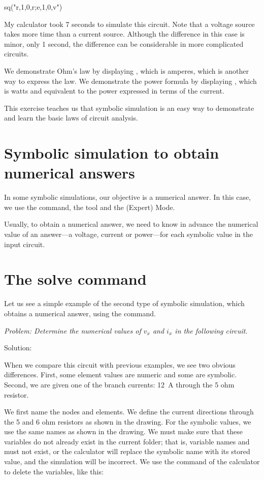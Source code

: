 \begin{entry}
sq\dc("r,1,0,r;e,1,0,v")
\end{entry}

My calculator took 7 seconds to simulate this circuit. Note that a
voltage source takes more time than a current source. Although the
difference in this case is minor, only 1 second, the difference can
be considerable in more complicated circuits.

We demonstrate Ohm's law by displaying , which is
 amperes, which is another way to express the law. We
demonstrate the power formula by displaying , which is
 watts and equivalent to the power expressed in terms
of the current.

This exercise teaches us that symbolic simulation is an easy way to
demonstrate and learn the basic laws of circuit analysis.

\section{Symbolic simulation to obtain numerical answers}

In some symbolic simulations, our objective is a numerical answer.
In this case, we use the  command, the 
tool and the (Expert) Mode.

Usually, to obtain a numerical answer, we need to know in advance
the numerical value of an answer---a voltage, current or power---for
each symbolic value in the input circuit.

\section{The solve command}

Let us see a simple example of the second type of symbolic
simulation, which obtains a numerical answer, using the 
command.


\emph{Problem: Determine the numerical values of $v_x$ and $i_x$ in
the following circuit.}

Solution:

When we compare this circuit with previous examples, we see two
obvious differences. First, some element values are numeric and some
are symbolic. Second, we are given one of the branch currents: 12~A
through the 5 ohm resistor.

We first name the nodes and elements. We define the current
directions through the 5 and 6 ohm resistors as shown in the
drawing. For the symbolic values, we use the same names as shown in
the drawing. We must make sure that these variables do not already
exist in the current folder; that is, variable names  and
 must not exist, or the calculator will replace the
symbolic name with its stored value, and the simulation will be
incorrect. We use the  command of the calculator to
delete the variables, like this:

